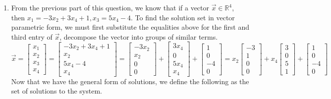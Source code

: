 \begin{SaveQuestion}
\begin{enumerate}
        \item From the previous part of this question, we know that if a vector $\vec x \in \mathbb{R}^4$, then $x_1 = -3x_2 + 3x_4 + 1, x_3 = 5x_4 - 4$. To find the solution set in vector parametric form, we must first substitute the equalities above for the first and third entry of $\vec x$, decompose the vector into groups of similar terms.
        $$\vec x = \begin{bmatrix} x_1 \\ x_2 \\ x_3 \\ x_4 \end{bmatrix} = \begin{bmatrix} -3x_2 + 3x_4 + 1 \\ x_2 \\ 5x_4 - 4 \\ x_4 \end{bmatrix} = \begin{bmatrix} -3x_2 \\ x_2 \\ 0 \\ 0 \end{bmatrix} + \begin{bmatrix} 3x_4 \\ 0 \\ 5x_4 \\ x_4 \end{bmatrix} + \begin{bmatrix} 1 \\ 0 \\ - 4 \\ 0 \end{bmatrix} = x_2 \begin{bmatrix} -3 \\ 1 \\ 0 \\ 0 \end{bmatrix} + x_4 \begin{bmatrix} 3 \\ 0 \\ 5 \\ 1 \end{bmatrix} + \begin{bmatrix} 1 \\ 0 \\ - 4 \\ 0 \end{bmatrix}$$
        Now that we have the general form of solutions, we define the following as the set of solutions to the system.

\end{enumerate}
\end{SaveQuestion}
